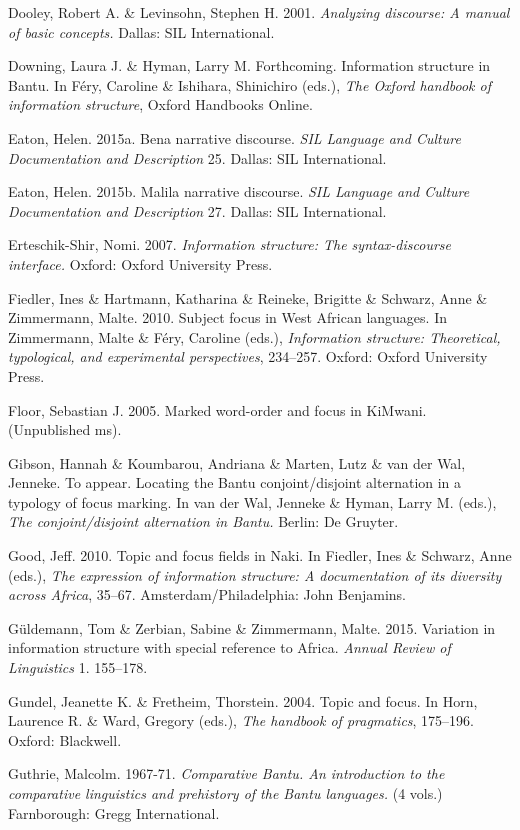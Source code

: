 \documentclass[output=paper]{langsci/langscibook}
\begin{document}
Dooley, Robert A. \& Levinsohn, Stephen H. 2001. \textit{Analyzing discourse: A manual of basic concepts.} Dallas: SIL International.

Downing, Laura J. \& Hyman, Larry M. Forthcoming. Information structure in Bantu. In Féry, Caroline \& Ishihara, Shinichiro (eds.), \textit{The Oxford handbook of information structure}, Oxford Handbooks Online.

Eaton, Helen. 2015a. Bena narrative discourse. \textit{SIL Language and Culture Documentation and Description} 25. Dallas: SIL International.

Eaton, Helen. 2015b. Malila narrative discourse. \textit{SIL Language and Culture Documentation and Description} 27. Dallas: SIL International.

Erteschik-Shir, Nomi. 2007. \textit{Information structure: The syntax-discourse interface.} Oxford: Oxford University Press.

Fiedler, Ines \& Hartmann, Katharina \& Reineke, Brigitte \& Schwarz, Anne \& Zimmermann, Malte. 2010. Subject focus in West African languages. In Zimmermann, Malte \& Féry, Caroline (eds.), \textit{Information structure: Theoretical, typological, and experimental perspectives}, 234–257. Oxford: Oxford University Press.

Floor, Sebastian J. 2005. Marked word-order and focus in KiMwani. (Unpublished ms).

Gibson, Hannah \& Koumbarou, Andriana \& Marten, Lutz \& van der Wal, Jenneke. To appear. Locating the Bantu conjoint/disjoint alternation in a typology of focus marking. In van der Wal, Jenneke \& Hyman, Larry M. (eds.), \textit{The conjoint/disjoint alternation in Bantu.} Berlin: De Gruyter.

Good, Jeff. 2010. Topic and focus fields in Naki. In Fiedler, Ines \& Schwarz, Anne (eds.), \textit{The expression of information structure: A documentation of its diversity across Africa}, 35–67. Amsterdam/Philadelphia: John Benjamins.

Güldemann, Tom \& Zerbian, Sabine \& Zimmermann, Malte. 2015. Variation in information structure with special reference to Africa. \textit{Annual Review of Linguistics} 1. 155–178.

Gundel, Jeanette K. \& Fretheim, Thorstein. 2004. Topic and focus. In Horn, Laurence R. \& Ward, Gregory (eds.), \textit{The handbook of pragmatics}, 175–196. Oxford: Blackwell.

Guthrie, Malcolm. 1967-71. \textit{Comparative Bantu. An introduction to the comparative linguistics and prehistory of the Bantu languages.} (4 vols.) Farnborough: Gregg International.
\end{document}
